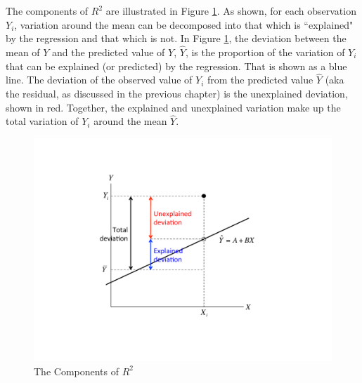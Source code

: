 \documentclass[11pt,openany]{book}\usepackage[]{graphicx}\usepackage[]{color}
\begin{document}
The components of $R^{2}$ are illustrated in Figure \ref{fig:rsquared}. As shown, for each observation $Y_{i}$, variation around the mean can be decomposed into that which is ``explained" by the regression and that which is not. In Figure \ref{fig:rsquared}, the deviation between the mean of $Y$ and the predicted value of $Y$, $\hat{Y}$, is the proportion of the variation of  $Y_{i}$ that can be explained (or predicted) by the regression. That is shown as a blue line. The deviation of the observed value of $Y_{i}$ from the predicted value $\hat{Y}$ (aka the residual, as discussed in the previous chapter) is the unexplained deviation, shown in red. Together, the explained and unexplained variation make up the total variation of  $Y_{i}$ around the mean $\hat{Y}$.

\begin{figure}
  \centering
  \includegraphics[width=5in]{09_InterpretSimple/rsquared.pdf}%
  \caption{The Components of $R^{2}$ \label{fig:rsquared}}
\end{figure}
\end{document}
